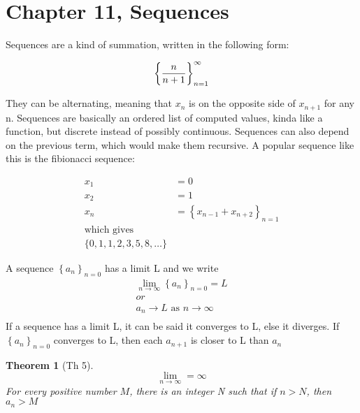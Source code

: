\documentclass[17pt]{extarticle} %
\begin{document}
\newcommand\abs[1]{\left|#1\right|} %
\newcommand{\seq}[2][0]{\left\{ #2 \right\}_{n=#1}}
\newtheorem{theorem}{Theorem}
\newtheorem*{theorem*}{Theorem}
\newtheorem*{definition}{Definition}

\section{Chapter 11, Sequences}




Sequences are a kind of summation, written in the following form:

$$
    \seq[1]{n \over n+1}^\infty
$$


They can be alternating, meaning that $x_n$ is on the opposite side of $x_{n+1}$ for any n. Sequences are basically an ordered list of computed values, kinda like a function, but discrete instead of possibly continuous. Sequences can also depend on the previous term, which would make them recursive. A popular sequence like this is the fibionacci sequence:

$$
    \begin{aligned}
        x_1 & = 0                          \\
        x_2 & = 1                          \\
        x_n & = \seq[1]{x_{n-1} + x_{n+2}} \\
        \text{which gives}                 \\
        \{0, 1, 1, 2, 3, 5, 8, \ldots\}
    \end{aligned}
$$


A sequence $\seq{a_n}$ has a limit L and we write
$$
    \begin{aligned}
        \lim_{n \to \infty} \seq{a_n} = L  \\
        or                                 \\
        a_n \to L \text{ as } n \to \infty \\
    \end{aligned}
$$
If a sequence has a limit L, it can be said it converges to L, else it diverges.
If $\seq{a_n}$ converges to L, then each $a_{n+1}$ is closer to L than $a_{n}$


\begin{theorem*}[Th 5]
    $$
        \lim_{n\to \infty} = \infty
    $$
    For every positive number $M$, there is an integer N such that if $n >  N$, then $a_n > M$
\end{theorem*}
\end{document}
